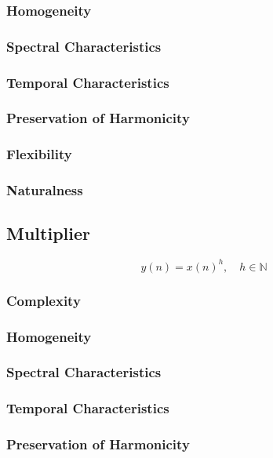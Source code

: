 		\subsubsection*{Homogeneity}
		\subsubsection*{Spectral Characteristics}
		\subsubsection*{Temporal Characteristics}
		\subsubsection*{Preservation of Harmonicity}
		\subsubsection*{Flexibility}
		\subsubsection*{Naturalness}

	\subsection{Multiplier}
	\label{sec:Excitation-Multiplier}
		\begin{equation}
			y(n) = x(n)^{h}, \quad h \in \mathbb{N}
			\label{eq:Multiplier}
		\end{equation}

		\subsubsection*{Complexity}
		\subsubsection*{Homogeneity}
		\subsubsection*{Spectral Characteristics}
		\subsubsection*{Temporal Characteristics}
		\subsubsection*{Preservation of Harmonicity}
